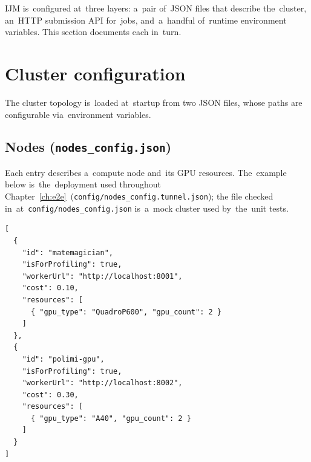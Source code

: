 IJM is~configured at~three layers: a~pair of~JSON files that describe
the~cluster, an~HTTP submission API for~jobs, and~a~handful of~runtime
environment variables.  This section documents each in~turn.

\section{Cluster configuration}

The cluster topology is~loaded at~startup from two JSON files, whose
paths are configurable via~environment variables.

\subsection{Nodes (\texttt{nodes\_config.json})}

Each entry describes a~compute node and~its GPU resources.  The~example
below is~the~deployment used throughout
Chapter~\ref{ch:e2e}~(\texttt{config/nodes\_config.tunnel.json}); the
file checked in~at~\texttt{config/nodes\_config.json} is~a~mock cluster
used by~the~unit tests.

\begin{lstlisting}[language={}, numbers=none]
[
  {
    "id": "matemagician",
    "isForProfiling": true,
    "workerUrl": "http://localhost:8001",
    "cost": 0.10,
    "resources": [
      { "gpu_type": "QuadroP600", "gpu_count": 2 }
    ]
  },
  {
    "id": "polimi-gpu",
    "isForProfiling": true,
    "workerUrl": "http://localhost:8002",
    "cost": 0.30,
    "resources": [
      { "gpu_type": "A40", "gpu_count": 2 }
    ]
  }
]
\end{lstlisting}

